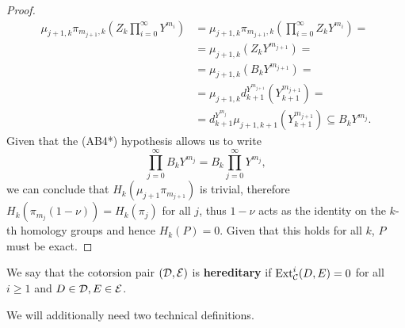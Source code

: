 \begin{proof}
    \begin{align*}
        \mu_{j+1, k} \pi_{m_{j+1}, k} \left(Z_k \prod_{i=0}^{\infty} Y^{m_i}  \right) &=  \mu_{j+1, k} \pi_{m_{j+1}, k}\left( \prod_{i=0}^{\infty} Z_k  Y^{m_i}  \right) = \\
        &= \mu_{j+1, k} \left( Z_k Y^{m_{j+1}} \right) = \\
        &= \mu_{j+1, k}  \left(B_k Y^{m_{j+1}} \right) = \\
        &= \mu_{j+1, k} d^{Y^{m_{j+1}}}_{k+1} \left(Y^{m_{j+1}}_{k+1} \right) = \\
        &=  d^{Y^{m_{j}}}_{k+1} \mu_{j+1, k+1} \left(Y^{m_{j+1}}_{k+1} \right) \subseteq B_k Y^{m_j}.
    \end{align*}
    Given that the (AB4*) hypothesis allows us to write \[\prod_{j=0}^\infty B_k Y^{m_j} =   B_k \prod_{j=0}^\infty Y^{m_j},\] we can conclude that $H_k (\mu_{j+1} \pi_{{m_{j+1}}})$ is trivial, therefore $H_k(\pi_{m_j}(1-\nu)) = H_k(\pi_j)$ for all $j$, thus $1-\nu$ acts as the identity on the $k$-th homology groups and hence $H_k(P) = 0$. Given that this holds for all $k$, $P$ must be exact.

    
\end{proof}







\begin{definition}
    We say that the cotorsion pair $(\mathcal{D}, \mathcal{E})$ is \textbf{hereditary} if $\mathrm{Ext}^i_{\mathcal{C}}(D,E) = 0$ for all $i \geq 1$ and $D\in \mathcal{D}, E\in \mathcal{E}$.
\end{definition}

We will additionally need two technical definitions.

